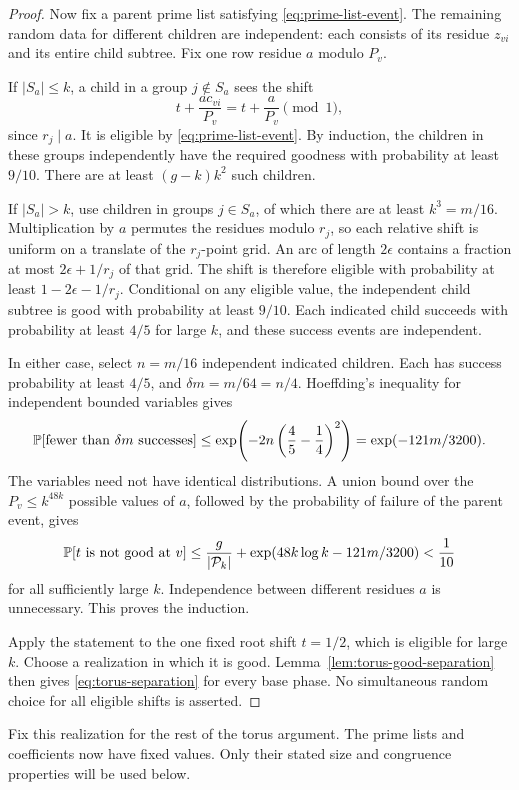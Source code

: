\begin{proof}
Now fix a parent prime list satisfying \eqref{eq:prime-list-event}.
The remaining random data for different children are independent:
each consists of its residue $z_{vi}$ and its entire child subtree.
Fix one row residue $a$ modulo $P_v$.

If $|S_a|\leq k$, a child in a group $j\notin S_a$ sees the shift
\[
 t+\frac{a c_{vi}}{P_v}
 =t+\frac a{P_v}\pmod1,
\]
since $r_j\mid a$. It is eligible by \eqref{eq:prime-list-event}.
By induction, the children in these groups independently have the
required goodness with probability at least $9/10$. There are at least
$(g-k)k^2$ such children.

If $|S_a|>k$, use children in groups $j\in S_a$, of which there are
at least $k^3=m/16$. Multiplication by $a$ permutes the residues
modulo $r_j$, so each relative shift is uniform on a translate of the
$r_j$-point grid. An arc of length $2\epsilon$ contains a fraction at
most $2\epsilon+1/r_j$ of that grid. The shift is therefore eligible
with probability at least $1-2\epsilon-1/r_j$. Conditional on any
eligible value, the independent child subtree is good with probability
at least $9/10$. Each indicated child succeeds with probability at
least $4/5$ for large $k$, and these success events are independent.

In either case, select $n=m/16$ independent indicated children.
Each has success probability at least $4/5$, and
$\delta m=m/64=n/4$. Hoeffding's inequality for independent bounded
variables \cite[Theorem~2]{Hoeffding1963} gives
\[
 \mathbb P[\text{fewer than }\delta m\text{ successes}]
 \leq\exp\!\left(-2n\left(\frac45-\frac14\right)^2\right)
 =\exp(-121m/3200).
\]
The variables need not have identical distributions. A union bound
over the $P_v\leq k^{48k}$ possible values of $a$, followed by the
probability of failure of the parent event, gives
\[
 \mathbb P[t\text{ is not good at }v]
 \leq\frac{g}{|\mathcal P_k|}
 +\exp(48k\log k-121m/3200)<\frac1{10}
\]
for all sufficiently large $k$. Independence between different
residues $a$ is unnecessary. This proves the induction.

Apply the statement to the one fixed root shift $t=1/2$, which is
eligible for large $k$. Choose a realization in which it is good.
Lemma~\ref{lem:torus-good-separation} then gives
\eqref{eq:torus-separation} for every base phase. No simultaneous
random choice for all eligible shifts is asserted.
\end{proof}

Fix this realization for the rest of the torus argument. The prime
lists and coefficients now have fixed values. Only their stated size
and congruence properties will be used below.
